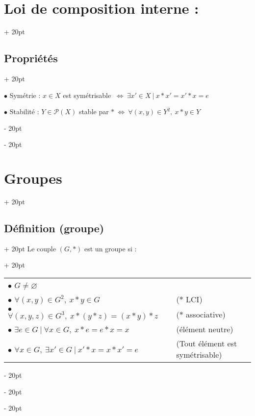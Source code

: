 \documentclass[a4paper, 12pt, twoside]{article}
\newcommand{\ssi}{\ \Leftrightarrow \ }
\newcommand{\ind}[1][20pt]{\advance\leftskip + #1}
\newcommand{\deind}[1][20pt]{\advance\leftskip - #1}
\newenvironment{indentedenv}[1][20pt]{\par \ind[#1]}{\par \deind}
\newenvironment{indt}[2][20pt]{#2 \begin{indentedenv}[#1]}{\end{indentedenv}} %
\begin{document}
\begin{indt}{\section{Loi de composition interne :}}
\begin{indt}{\subsection{Propriétés}}
            \vspace{6pt}
            
            $\bullet$ Symétrie : $x \in X$ est symétrisable $\ssi \exists x' \in X\ |\ x*x' = x'*x = e$
            
            \vspace{6pt}
            
            $\bullet$ Stabilité : $Y \in \mathcal P(X)$ stable par $* \ssi \forall (x, y) \in Y^2,\ x*y \in Y$
        \end{indt}
        
    \end{indt}
    
    \vspace{6pt}
    
    \begin{indt}{\section{Groupes}}
        \begin{indt}{\subsection{Définition (groupe)}}
            \begin{indt}{Le couple $(G, *)$ est un groupe si :}
                \begin{tabular}{ll}
                    $\bullet$ $G \neq \varnothing$
                    \vspace{6pt}
                    \\
                    $\bullet$ $\forall (x, y) \in G^2,\ x * y \in G \quad$
                    & ($*$ LCI)
                    \vspace{6pt}
                    \\
                    $\bullet$ $\forall (x, y, z) \in G^3,\ x * (y * z) = (x * y) * z \quad$
                    & ($*$ associative)
                    \vspace{6pt}
                    \\
                    $\bullet$ $\exists e \in G\ |\ \forall x \in G,\ x * e = e * x = x \quad$
                    & (élément neutre)
                    \vspace{6pt}
                    \\
                    $\bullet$ $\forall x \in G,\ \exists x' \in G\ |\ x' * x = x * x' = e$
                    & (Tout élément est symétrisable)
                \end{tabular}
                

\end{indt}
\end{indt}
\end{indt}
\end{document}
